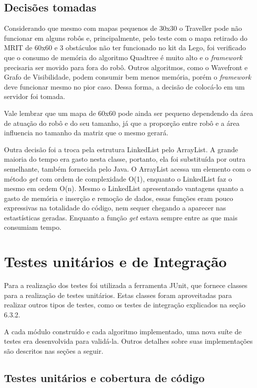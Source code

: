 \subsection{Decisões tomadas}

Considerando que mesmo com mapas pequenos de 30x30 o Traveller pode não funcionar em alguns robôs e, principalmente, pelo teste com o mapa retirado do MRIT de 60x60 e 3 obstáculos não ter funcionado no kit da Lego, foi verificado que o consumo de memória do algoritmo Quadtree é muito alto e o \textit{framework} precisaria ser movido para fora do robô. Outros algoritmos, como o Wavefront e Grafo de Visibilidade, podem consumir bem menos memória, porém o \textit{framework} deve funcionar mesmo no pior caso. Dessa forma, a decisão de colocá-lo em um servidor foi tomada.

Vale lembrar que um mapa de 60x60 pode ainda ser pequeno dependendo da área de atuação do robô e do seu tamanho, já que a proporção entre robô e a área influencia no tamanho da matriz que o mesmo gerará.

Outra decisão foi a troca pela estrutura LinkedList pelo ArrayList. A grande maioria do tempo era gasto nesta classe, portanto, ela foi substituída por outra semelhante, também fornecida pelo Java. O ArrayList acessa um elemento com o método \textit{get} com ordem de complexidade O(1), enquanto o LinkedList faz o mesmo em ordem O(n). Mesmo o LinkedList apresentando vantagens quanto a gasto de memória e inserção e remoção de dados, essas funções eram pouco expressivas na totalidade do código, nem sequer chegando a aparecer nas estastísticas geradas. Enquanto a função \textit{get} estava sempre entre as que mais consumiam tempo.

\section{Testes unitários e de Integração}

Para a realização dos testes foi utilizada a ferramenta JUnit, que fornece classes para a realização de testes unitários. Estas classes foram aproveitadas para realizar outros tipos de testes, como os testes de integração explicados na seção 6.3.2.

A cada módulo construído e cada algoritmo implementado, uma nova suíte de testes era desenvolvida para validá-la. Outros detalhes sobre suas implementações são descritos nas seções a seguir.

\subsection{Testes unitários e cobertura de código}

